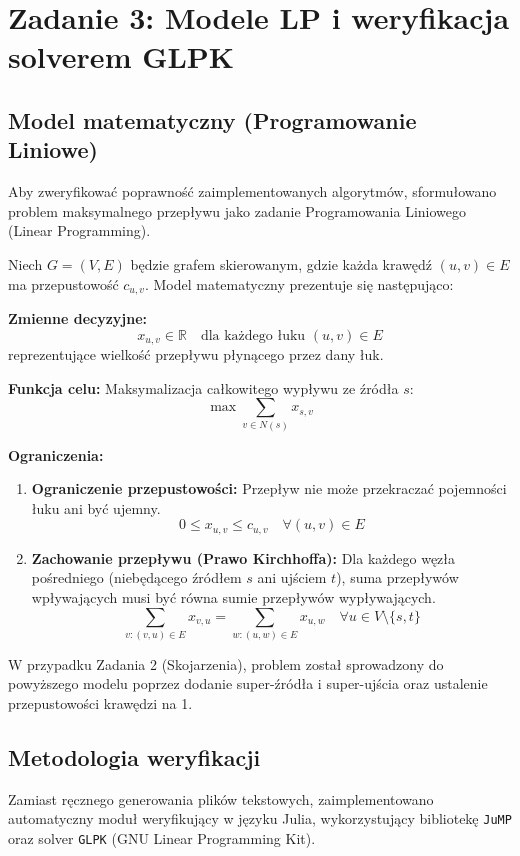 \documentclass[11pt, a4paper]{article}
\begin{document}
\section{Zadanie 3: Modele LP i weryfikacja solverem GLPK}

\subsection{Model matematyczny (Programowanie Liniowe)}
Aby zweryfikować poprawność zaimplementowanych algorytmów, sformułowano problem maksymalnego przepływu jako zadanie Programowania Liniowego (Linear Programming).

Niech $G=(V,E)$ będzie grafem skierowanym, gdzie każda krawędź $(u,v) \in E$ ma przepustowość $c_{u,v}$.
Model matematyczny prezentuje się następująco:

\noindent \textbf{Zmienne decyzyjne:}
$$ x_{u,v} \in \mathbb{R} \quad \text{dla każdego łuku } (u,v) \in E $$
reprezentujące wielkość przepływu płynącego przez dany łuk.

\noindent \textbf{Funkcja celu:}
Maksymalizacja całkowitego wypływu ze źródła $s$:
$$ \max \sum_{v \in N(s)} x_{s,v} $$

\noindent \textbf{Ograniczenia:}
\begin{enumerate}
    \item \textbf{Ograniczenie przepustowości:} Przepływ nie może przekraczać pojemności łuku ani być ujemny.
    $$ 0 \le x_{u,v} \le c_{u,v} \quad \forall (u,v) \in E $$
    
    \item \textbf{Zachowanie przepływu (Prawo Kirchhoffa):} Dla każdego węzła pośredniego (niebędącego źródłem $s$ ani ujściem $t$), suma przepływów wpływających musi być równa sumie przepływów wypływających.
    $$ \sum_{v: (v,u) \in E} x_{v,u} = \sum_{w: (u,w) \in E} x_{u,w} \quad \forall u \in V \setminus \{s, t\} $$
\end{enumerate}

W przypadku Zadania 2 (Skojarzenia), problem został sprowadzony do powyższego modelu poprzez dodanie super-źródła i super-ujścia oraz ustalenie przepustowości krawędzi na 1.

\subsection{Metodologia weryfikacji}
Zamiast ręcznego generowania plików tekstowych, zaimplementowano automatyczny moduł weryfikujący w języku Julia, wykorzystujący bibliotekę \texttt{JuMP} oraz solver \texttt{GLPK} (GNU Linear Programming Kit).
\end{document}

